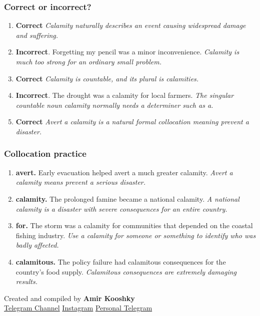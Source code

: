\documentclass[11pt]{article}
\begin{document}
\subsubsection{Correct or incorrect?}
\begin{enumerate}
  \item \textbf{Correct} \emph{Calamity naturally describes an event causing widespread damage and suffering.}
  \item \textbf{Incorrect}. Forgetting my pencil was a minor inconvenience. \emph{Calamity is much too strong for an ordinary small problem.}
  \item \textbf{Correct} \emph{Calamity is countable, and its plural is calamities.}
  \item \textbf{Incorrect}. The drought was a calamity for local farmers. \emph{The singular countable noun calamity normally needs a determiner such as a.}
  \item \textbf{Correct} \emph{Avert a calamity is a natural formal collocation meaning prevent a disaster.}
\end{enumerate}

\subsubsection{Collocation practice}
\begin{enumerate}
  \item \textbf{avert.} Early evacuation helped avert a much greater calamity. \emph{Avert a calamity means prevent a serious disaster.}
  \item \textbf{calamity.} The prolonged famine became a national calamity. \emph{A national calamity is a disaster with severe consequences for an entire country.}
  \item \textbf{for.} The storm was a calamity for communities that depended on the coastal fishing industry. \emph{Use a calamity for someone or something to identify who was badly affected.}
  \item \textbf{calamitous.} The policy failure had calamitous consequences for the country's food supply. \emph{Calamitous consequences are extremely damaging results.}
\end{enumerate}

\vfill
\begin{center}
\small\color{Muted} Created and compiled by \textbf{Amir Kooshky}\\
\href{https://t.me/KooshkyTOEFL}{Telegram Channel}\quad\textbullet\quad
\href{https://www.instagram.com/kooshkytoefl}{Instagram}\quad\textbullet\quad
\href{https://t.me/KooshkyTOEFL\_pv}{Personal Telegram}
\end{center}
\end{document}

